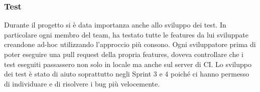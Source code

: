 \subsubsection{Test}
Durante il progetto si è data importanza anche allo sviluppo dei test.
In particolare ogni membro del team, ha testato tutte le features da lui sviluppate creandone ad-hoc utilizzando l'approccio più consono.
Ogni sviluppatore prima di poter eseguire una pull request della propria features, doveva controllare che i test eseguiti passassero non solo in locale ma anche sul server di CI.
Lo sviluppo dei test è stato di aiuto soprattutto negli Sprint 3 e 4 poiché ci hanno permesso di individuare e di risolvere i bug più velocemente.

\newpage